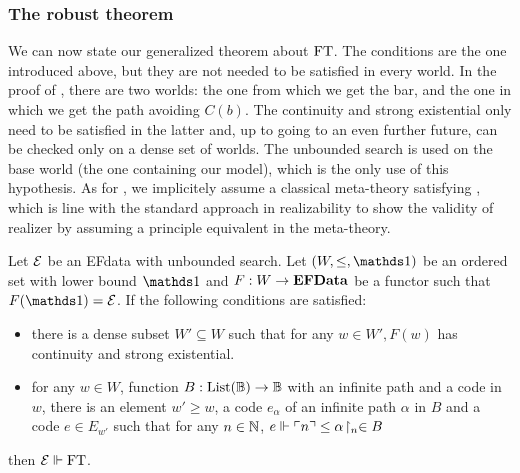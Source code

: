 \documentclass[a4paper,UKenglish,cleveref, autoref, thm-restate]{lipics-v2021}
\begin{document}
\subsubsection{The robust theorem}
We can now state our generalized theorem about $\mathrm{FT}$. The conditions are the one introduced above, but they are not needed to be satisfied in every world. In the proof of , there are two worlds: the one from which we get the bar, and the one in which we get the path avoiding $C(b)$. The continuity and strong existential only need to be satisfied in the latter and, up to going to an even further future, can be checked only on a dense set of worlds. The unbounded search is used on the base world (the one containing our model), which is the only use of this hypothesis.
As for ,
we implicitely assume a classical meta-theory satisfying \WKL,
which is line with the standard approach in realizability to show the validity
of realizer by assuming a principle equivalent in the meta-theory.
\begin{theorem}\label{thm:main}
  Let $\mathcal{E}$ be an EFdata with unbounded search. Let $(W,\leq,\bOne)$ be an ordered set with lower bound $\bOne$ and $F : W \to \mathbf{EFData}$ be a functor such that $F(\bOne) = \EFE$. If the following conditions are satisfied:
  \begin{itemize}
  \item there is a dense subset $W' \subseteq W$ such that for any $w \in W', F(w)$ has continuity and strong existential.
  \item for any $w \in W$, function $B : \mathrm{List}(\mathbb B) \to \mathbb B$ with an infinite path
  and a code in $w$, there is an element $w' \geq w$,
  a code $e_\alpha$ of an infinite path $\alpha$ in $B$
  and a code $e \in E_{w'}$ such that for any $n \in \mathbb N$,
  $e \Vdash \ulcorner n\urcorner \leq {\alpha}\!\upharpoonright_{n} \in B$
  \end{itemize}
  then $\mathcal{E} \Vdash \mathrm{FT}$.
\end{theorem}
\end{document}
